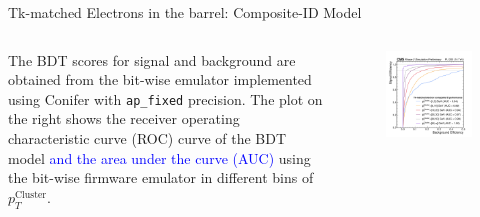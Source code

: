 \documentclass[aspectratio=169]{beamer}\usepackage[utf8]{inputenc}
\begin{document}
\begin{frame}{Tk-matched Electrons in the barrel: Composite-ID Model}

\begin{columns}[c]

\begin{column}{.45\textwidth}
\begin{minipage}{\textwidth}

The BDT scores for signal and background are obtained from the bit-wise emulator implemented using Conifer with \texttt{ap\_fixed} precision.
The plot on the right shows the receiver operating characteristic curve (ROC) curve of the BDT model \textcolor{blue}{and the area under the curve (AUC)} using the bit-wise firmware emulator in different bins of $p_T^{\text{Cluster}}$.
\end{minipage}
\end{column}

\begin{column}{.5\textwidth}
\vspace{-1.5cm}
\begin{figure}
\centering
    \vspace{0.5cm}
    \includegraphics[width=\textwidth]{barrel_figs/DPS_pt_roc-1.pdf}
\end{figure}
\end{column}

\end{columns}
\end{frame}
\end{document}
